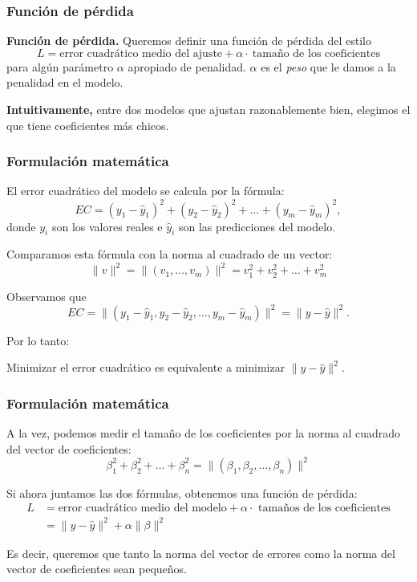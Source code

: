 \documentclass[aspectratio=169,12pt]{beamer}
\begin{document}
\begin{frame}
\frametitle{Función de pérdida}

\textbf{Función de pérdida.} Queremos definir una función de pérdida del estilo
$$L = \text{error cuadrático medio del ajuste} + \alpha \cdot \ \text{tamaño de los coeficientes}$$
para algún parámetro $\alpha$ apropiado de penalidad. $\alpha$ es el \emph{peso} que le damos a la penalidad en el modelo.

\textbf{Intuitivamente,} entre dos modelos que ajustan razonablemente bien, elegimos el que tiene coeficientes más chicos.
\end{frame}

\begin{frame}
\frametitle{Formulación matemática}

El error cuadrático del modelo se calcula por la fórmula:
$$
EC = (y_1 - \hat y_1)^2 + (y_2 - \hat y_2)^2 + \dots + (y_m - \hat y_m)^2,
$$
donde $y_i$ son los valores reales e $\hat y_i$ son las predicciones del modelo.

Comparamos esta fórmula con la norma al cuadrado  de un vector:
$$
\|v\|^2 = \|(v_1, \dots, v_m)\|^2 = v_1^2 + v_2^2 + \dots + v_m^2
$$

Observamos que 
$$EC = \|(y_1 - \hat y_1, y_2 - \hat y_2, \dots, y_m - \hat y_m)\|^2 = \|y - \hat y\|^2.$$

Por lo tanto:
\begin{block}{}
\centering
Minimizar el error cuadrático es equivalente a minimizar $\|y - \hat y\|^2$.
\end{block}

\end{frame}

\begin{frame}
\frametitle{Formulación matemática}

A la vez, podemos medir el tamaño de los coeficientes por la norma al cuadrado del vector de coeficientes:
$$
\beta_1^2 + \beta_2^2 + \dots + \beta_n^2 = \|(\beta_1, \beta_2, \dots, \beta_n)\|^2
$$

Si ahora juntamos las dos fórmulas, obtenemos una función de pérdida:
\begin{align*}
L &= \text{error cuadrático medio del modelo} + \alpha \cdot \text{ tamaños de los coeficientes} \\
&= \|y - \hat y\|^2 + \alpha \|\beta\|^2
\end{align*}

Es decir, queremos que tanto la norma del vector de errores como la norma del vector de coeficientes sean pequeños.
\end{frame}
\end{document}
